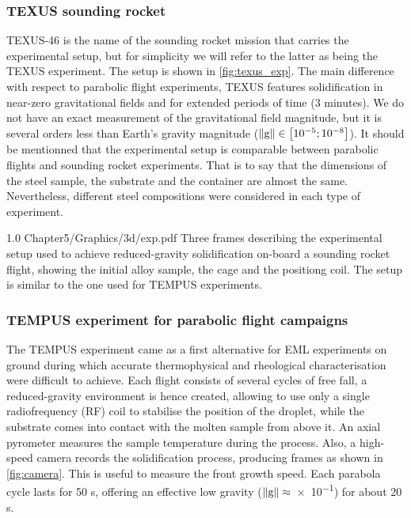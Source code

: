 \subsubsection{TEXUS sounding rocket}
TEXUS-46 is the name of the sounding rocket mission that carries the experimental setup, 
but for simplicity we will refer to the latter as being the TEXUS experiment. The setup is shown in \cref{fig:texus_exp}.
The main difference with respect to parabolic flight experiments,
TEXUS features solidification in near-zero gravitational fields and for extended periods of time (3 minutes). 
We do not have an exact measurement of the gravitational field magnitude, but it is several orders
less than Earth's gravity magnitude ($\lVert \boldsymbol{\text{g}} \rVert \in \left[ 10^{-5};10^{-8} \right]$\si{\uacceleration}).
It should be mentionned that the experimental setup is comparable between parabolic flights and sounding rocket experiments. That is to say
that the dimensions of the steel sample, the substrate and the container are almost the same. Nevertheless, different steel compositions were
considered in each type of experiment.

\begin{figureth}
{1.0}
{Chapter5/Graphics/3d/exp.pdf}
{Three frames describing the experimental setup used to achieve reduced-gravity 
solidification on-board a sounding rocket flight,
showing the initial alloy sample, the cage and the positiong coil. The setup
is similar to the one used for TEMPUS experiments.}
\label{fig:texus_exp}
\end{figureth}


\subsubsection{TEMPUS experiment for parabolic flight campaigns}

The TEMPUS experiment came as a first alternative for EML experiments on ground during which accurate thermophysical and rheological characterisation were difficult to achieve.
Each flight consists of several cycles of free fall, a reduced-gravity environment is hence created, 
allowing to use only a single radiofrequency (RF) coil to stabilise the position of the droplet, while the substrate comes into contact with the molten sample
from above it. An axial pyrometer measures the sample temperature during the process. 
Also, a high-speed camera records the solidification process, producing frames as shown in \cref{fig:camera}.
This is useful to measure the front growth speed. 
Each parabola cycle lasts for 50 s, offering an effective low gravity ($\lVert \boldsymbol{\text{g}} \rVert\approx$\SI{e-1}{\uacceleration}) for about 20 s.


